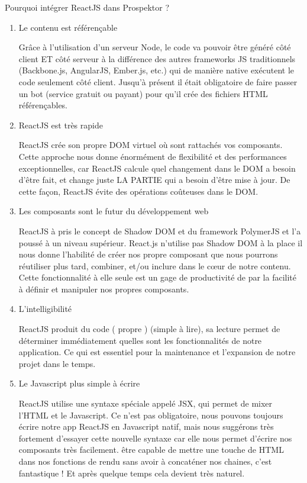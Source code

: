 Pourquoi int\'egrer ReactJS dans Prospektor ?

\begin{enumerate}
\item Le contenu est r\'ef\'eren\c{c}able

Gr\^ace \`a l'utilisation d'un serveur Node, le code va pouvoir \^etre g\'en\'er\'e c\^ot\'e client ET c\^ot\'e serveur \`a la diff\'erence des autres frameworks JS traditionnels (Backbone.js, AngularJS, Ember.js, etc.) qui de mani\`ere native ex\'ecutent le code seulement c\^ot\'e client. Jusqu'\`a pr\'esent il \'etait obligatoire de faire passer un bot (service gratuit ou payant) pour qu'il cr\'ee des fichiers HTML r\'ef\'eren\c{c}ables.

\item ReactJS est tr\`es rapide

ReactJS cr\'ee son propre DOM virtuel o\`u sont rattach\'es vos composants. Cette approche nous donne \'enorm\'ement de flexibilit\'e et des performances exceptionnelles, car ReactJS calcule quel changement dans le DOM a besoin d'\^etre fait, et change juste LA PARTIE qui a besoin d'\^etre mise \`a jour. De cette fa\c{c}on, ReactJS \'evite des op\'erations co\^uteuses dans le DOM.

\item Les composants sont le futur du d\'eveloppement web

ReactJS \`a pris le concept de Shadow DOM et du framework PolymerJS et l'a pouss\'e \`a un niveau sup\'erieur. React.js n'utilise pas Shadow DOM \`a la place il nous donne l'habilit\'e de cr\'eer nos propre composant que nous pourrons r\'eutiliser plus tard, combiner, et/ou inclure dans le c\oe{}ur de notre contenu. Cette fonctionnalit\'e \`a elle seule est un gage de productivit\'e de par la facilit\'e \`a d\'efinir et manipuler nos propres composants.

\item L'intelligibilit\'e

ReactJS produit du code ( propre ) (simple \`a lire), sa lecture permet de d\'eterminer imm\'ediatement quelles sont les fonctionnalit\'es de notre application. Ce qui est essentiel pour la maintenance et l'expansion de notre projet dans le temps.

\item Le Javascript plus simple \`a \'ecrire

ReactJS utilise une syntaxe sp\'eciale appel\'e JSX, qui permet de mixer l'HTML et le Javascript. Ce n'est pas obligatoire, nous pouvons toujours \'ecrire notre app ReactJS en Javascript natif, mais nous sugg\'erons tr\`es fortement d'essayer cette nouvelle syntaxe car elle nous permet d'\'ecrire nos composants tr\`es facilement. \^etre capable de mettre une touche de HTML dans nos fonctions de rendu sans avoir \`a concat\'ener nos chaines, c'est fantastique ! Et apr\`es quelque temps cela devient tr\`es naturel.

\end{enumerate}


